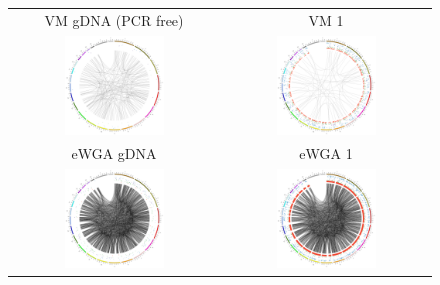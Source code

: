 \begin{figure}
\begin{tabular}{cc}
VM gDNA (PCR free) & VM 1 \\
\includegraphics[keepaspectratio,width=0.5\textwidth]{./figures/circos/LX0gDNA_0529} & \includegraphics[keepaspectratio,width=0.5\textwidth]{./figures/circos/LX1_0529} \\
eWGA gDNA & eWGA 1 \\
\includegraphics[keepaspectratio,width=0.5\textwidth]{./figures/circos/SRR1777284gDNA_0529} & \includegraphics[keepaspectratio,width=0.5\textwidth]{./figures/circos/SRR1777287_0529} \\

\end{tabular}
\end{figure}

